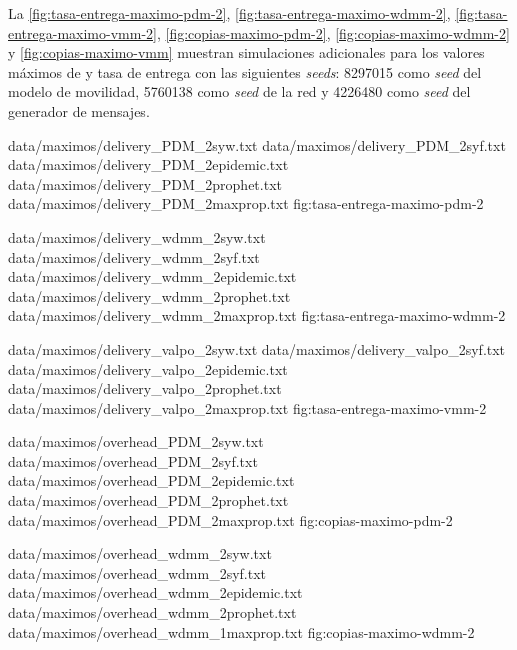  
La \ref{fig:tasa-entrega-maximo-pdm-2}, \ref{fig:tasa-entrega-maximo-wdmm-2},
\ref{fig:tasa-entrega-maximo-vmm-2}, \ref{fig:copias-maximo-pdm-2},
\ref{fig:copias-maximo-wdmm-2} y \ref{fig:copias-maximo-vmm} muestran
simulaciones adicionales para los valores máximos de \overhead{} y tasa de
entrega con las siguientes \textit{seeds}: 8297015 como \textit{seed} del modelo
de movilidad, 5760138 como \textit{seed} de la red y 4226480 como \textit{seed}
del generador de mensajes.


{
{data/maximos/delivery_PDM_2syw.txt}
{data/maximos/delivery_PDM_2syf.txt}
{data/maximos/delivery_PDM_2epidemic.txt}
{data/maximos/delivery_PDM_2prophet.txt}
{data/maximos/delivery_PDM_2maxprop.txt}
}{fig:tasa-entrega-maximo-pdm-2}


{
{data/maximos/delivery_wdmm_2syw.txt}
{data/maximos/delivery_wdmm_2syf.txt}
{data/maximos/delivery_wdmm_2epidemic.txt}
{data/maximos/delivery_wdmm_2prophet.txt}
{data/maximos/delivery_wdmm_2maxprop.txt}
}{fig:tasa-entrega-maximo-wdmm-2}



{
{data/maximos/delivery_valpo_2syw.txt}
{data/maximos/delivery_valpo_2syf.txt}
{data/maximos/delivery_valpo_2epidemic.txt}
{data/maximos/delivery_valpo_2prophet.txt}
{data/maximos/delivery_valpo_2maxprop.txt}
}{fig:tasa-entrega-maximo-vmm-2}


{
{data/maximos/overhead_PDM_2syw.txt}
{data/maximos/overhead_PDM_2syf.txt}
{data/maximos/overhead_PDM_2epidemic.txt}
{data/maximos/overhead_PDM_2prophet.txt}
{data/maximos/overhead_PDM_2maxprop.txt}
}{fig:copias-maximo-pdm-2}


{
{data/maximos/overhead_wdmm_2syw.txt}
{data/maximos/overhead_wdmm_2syf.txt}
{data/maximos/overhead_wdmm_2epidemic.txt}
{data/maximos/overhead_wdmm_2prophet.txt}
{data/maximos/overhead_wdmm_1maxprop.txt}
}{fig:copias-maximo-wdmm-2}




